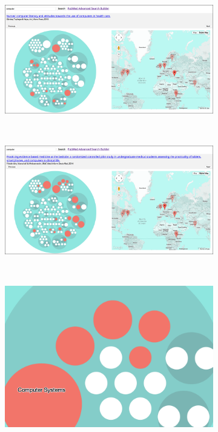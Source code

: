 \documentclass[Report.tex]{subfiles}
\begin{document}
\begin{figure}[!]
\begin{center}
	\begin{subfigure}{0.8\textwidth}
		\includegraphics[width=\textwidth]{../lib/images/screen1}
	\end{subfigure}\\
	\par\bigskip
	\begin{subfigure}{0.8\textwidth}
		\includegraphics[width=\textwidth]{../lib/images/screen2}
	\end{subfigure}\\
\end{center}
	\begin{subfigure}{0.45\textwidth}
		\includegraphics[width=\textwidth]{../lib/images/screen3}

\end{subfigure}
\end{figure}
\end{document}
